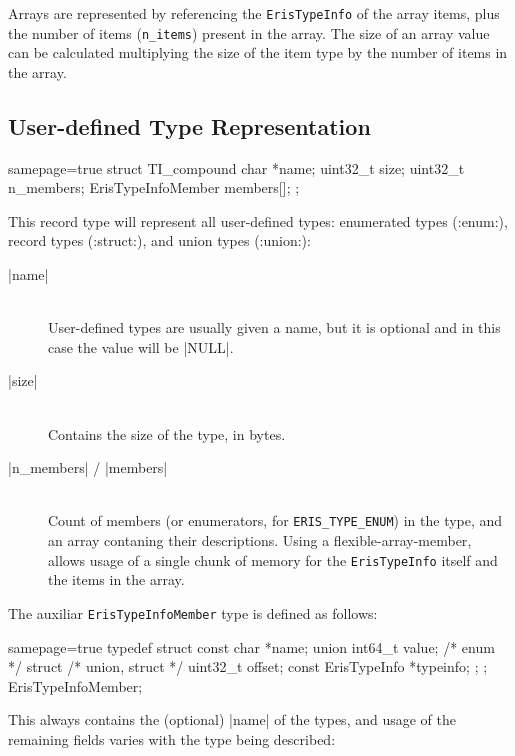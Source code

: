 \noindent
Arrays are represented by referencing the \verb|ErisTypeInfo| of the array
items, plus the number of items (\verb|n_items|) present in the array. The
size of an array value can be calculated multiplying the size of the item type
by the number of items in the array.


\subsection{User-defined Type Representation}

\begin{ccode*}{samepage=true}
  struct TI_compound {
    char              *name;
    uint32_t           size;
    uint32_t           n_members;
    ErisTypeInfoMember members[];
  };
\end{ccode*}

\noindent
This record type will represent all user-defined types: enumerated types
(\Mc:enum:), record types (\Mc:struct:), and union types (\Mc:union:):

\begin{description}
  \item [\Mc|name|] \hfill \\
    User-defined types are usually given a name, but it is optional and in
    this case the value will be \Mc|NULL|.
  \item [\Mc|size|] \hfill \\
    Contains the size of the type, in bytes.
  \item [\Mc|n_members| / \Mc|members|] \hfill \\
    Count of members (or enumerators, for \verb|ERIS_TYPE_ENUM|) in the type,
    and an array contaning their descriptions. Using
    a \gls{flexible-array-member}, allows usage of a single chunk of memory
    for the \verb|ErisTypeInfo| itself and the items in the array.
\end{description}

\noindent
The auxiliar \verb|ErisTypeInfoMember| type is defined as follows:

\begin{ccode*}{samepage=true}
  typedef struct {
    const char             *name;
    union {
      int64_t               value; /* enum */
      struct {                     /* union, struct */
        uint32_t            offset;
        const ErisTypeInfo *typeinfo;
      };
    };
  } ErisTypeInfoMember;
\end{ccode*}

\noindent
This always contains the (optional) \Mc|name| of the types, and usage of the
remaining fields varies with the type being described:

